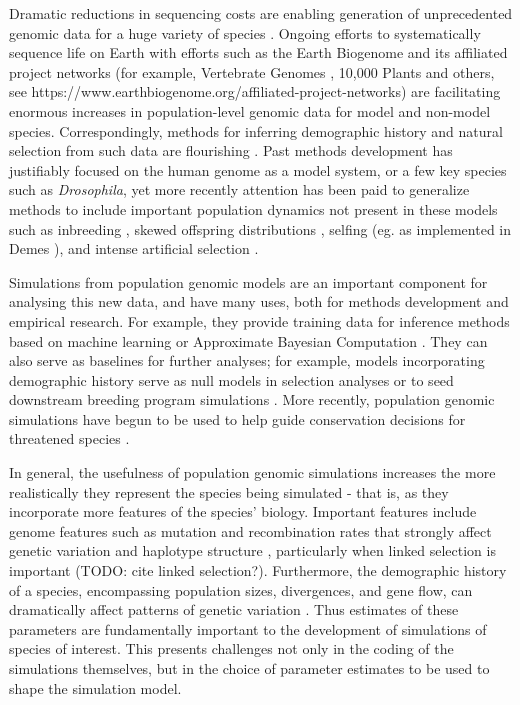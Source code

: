 \documentclass[hidelinks]{article}
\begin{document}
Dramatic reductions in sequencing costs are enabling generation of
unprecedented genomic data for a huge variety of species
\citep{Ellegren2014}. Ongoing efforts to systematically sequence life on
Earth with efforts such as the Earth Biogenome \citep{Lewin2022} and its
affiliated project networks (for example, Vertebrate Genomes
\citep{Rhie2021}, 10,000 Plants \citep{Cheng2018} and others, see
https://www.earthbiogenome.org/affiliated-project-networks) are
facilitating enormous increases in population-level genomic data for
model and non-model species. Correspondingly, methods for inferring
demographic history and natural selection from such data are flourishing
\citep{Beichman2018}. Past methods development has justifiably focused on the
human genome as a model system, or a few key species such as
\emph{Drosophila}, yet more recently attention has been paid to
generalize methods to include important population dynamics not present
in these models such as inbreeding \citep{Blischak2020}, skewed offspring
distributions \citep{Montano2016}, selfing (eg. as implemented in Demes
\citep{Gower2022}), and intense artificial selection \citep{MacLeod2013,
MacLeod2014}.

Simulations from population genomic models are an important component
for analysing this new data, and have many uses, both for methods
development and empirical research. For example, they provide training
data for inference methods based on machine learning \citep{Schrider2018} or
Approximate Bayesian Computation \citep{Csillery2010}. They can also serve as
baselines for further analyses; for example, models incorporating
demographic history serve as null models in selection analyses
\citep{Hsieh2016a} or to seed downstream breeding program simulations
\citep{Gaynor2020}. More recently, population genomic simulations have begun
to be used to help guide conservation decisions for threatened species
\citep{Teixeira2021}.

In general, the usefulness of population genomic simulations increases
the more realistically they represent the species being simulated - that
is, as they incorporate more features of the species' biology. Important
features include genome features such as mutation and recombination
rates that strongly affect genetic variation and haplotype structure
\citep{Nachman2002}, particularly when linked selection is important (TODO:
cite linked selection?). Furthermore, the demographic history of a
species, encompassing population sizes, divergences, and gene flow, can
dramatically affect patterns of genetic variation \citep{Teshima2006}. Thus
estimates of these parameters are fundamentally important to the
development of simulations of species of interest. This presents
challenges not only in the coding of the simulations themselves, but in
the choice of parameter estimates to be used to shape the simulation
model.
\end{document}
